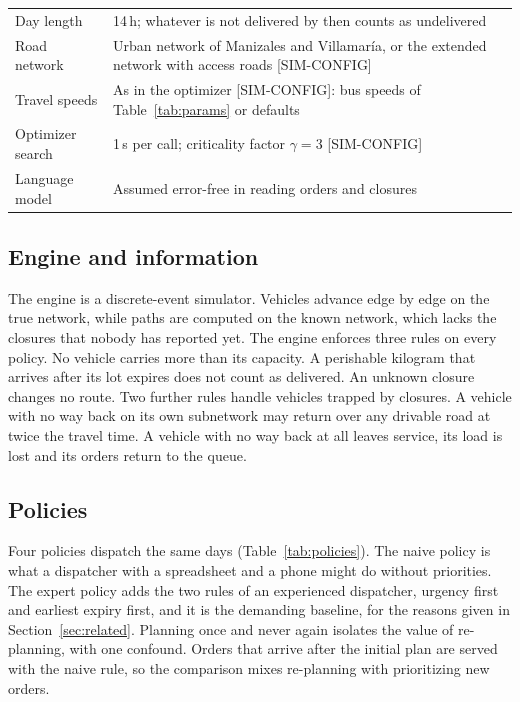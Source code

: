 \documentclass[11pt]{article}
\newcommand{\pend}[1]{\textcolor{red!60!black}{#1}}
\begin{document}
\begin{table}[ht]
\begin{tabularx}{\linewidth}{L{4.6cm} Y}
Day length & 14\,h; whatever is not delivered by then counts as undelivered \\
Road network & Urban network of Manizales and Villamaría, or the extended network with access roads \pend{[SIM-CONFIG]} \\
Travel speeds & As in the optimizer \pend{[SIM-CONFIG]: bus speeds of Table~\ref{tab:params} or defaults} \\
Optimizer search & 1\,s per call; criticality factor $\gamma=3$ \pend{[SIM-CONFIG]} \\
Language model & Assumed error-free in reading orders and closures \\
\bottomrule
\end{tabularx}
\end{table}

\subsection{Engine and information}

The engine is a discrete-event simulator. Vehicles advance edge by edge on the true network, while paths are computed on the known network, which lacks the closures that nobody has reported yet. The engine enforces three rules on every policy. No vehicle carries more than its capacity. A perishable kilogram that arrives after its lot expires does not count as delivered. An unknown closure changes no route. Two further rules handle vehicles trapped by closures. A vehicle with no way back on its own subnetwork may return over any drivable road at twice the travel time. A vehicle with no way back at all leaves service, its load is lost and its orders return to the queue.

\subsection{Policies}

Four policies dispatch the same days (Table~\ref{tab:policies}). The naive policy is what a dispatcher with a spreadsheet and a phone might do without priorities. The expert policy adds the two rules of an experienced dispatcher, urgency first and earliest expiry first, and it is the demanding baseline, for the reasons given in Section~\ref{sec:related}. Planning once and never again isolates the value of re-planning, with one confound. Orders that arrive after the initial plan are served with the naive rule, so the comparison mixes re-planning with prioritizing new orders.
\end{document}
